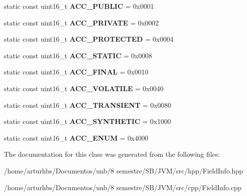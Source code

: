 \begin{DoxyCompactItemize}
\item 
static const uint16\+\_\+t {\bfseries A\+C\+C\+\_\+\+P\+U\+B\+L\+IC} = 0x0001\hypertarget{classFieldInfo_a75f5363e21c20fc65a93fc11a9aabcd3}{}\label{classFieldInfo_a75f5363e21c20fc65a93fc11a9aabcd3}

\item 
static const uint16\+\_\+t {\bfseries A\+C\+C\+\_\+\+P\+R\+I\+V\+A\+TE} = 0x0002\hypertarget{classFieldInfo_a693cbb85341c9b61b710f56f89d56442}{}\label{classFieldInfo_a693cbb85341c9b61b710f56f89d56442}

\item 
static const uint16\+\_\+t {\bfseries A\+C\+C\+\_\+\+P\+R\+O\+T\+E\+C\+T\+ED} = 0x0004\hypertarget{classFieldInfo_ac9df52613f502a46611a670d07715d74}{}\label{classFieldInfo_ac9df52613f502a46611a670d07715d74}

\item 
static const uint16\+\_\+t {\bfseries A\+C\+C\+\_\+\+S\+T\+A\+T\+IC} = 0x0008\hypertarget{classFieldInfo_a9358cd6a36145926bedbd8718c0118c5}{}\label{classFieldInfo_a9358cd6a36145926bedbd8718c0118c5}

\item 
static const uint16\+\_\+t {\bfseries A\+C\+C\+\_\+\+F\+I\+N\+AL} = 0x0010\hypertarget{classFieldInfo_a75c707ef25ffeac2c597fb4b263d7f0c}{}\label{classFieldInfo_a75c707ef25ffeac2c597fb4b263d7f0c}

\item 
static const uint16\+\_\+t {\bfseries A\+C\+C\+\_\+\+V\+O\+L\+A\+T\+I\+LE} = 0x0040\hypertarget{classFieldInfo_abfd881c22b6614454d43b694f7917a5b}{}\label{classFieldInfo_abfd881c22b6614454d43b694f7917a5b}

\item 
static const uint16\+\_\+t {\bfseries A\+C\+C\+\_\+\+T\+R\+A\+N\+S\+I\+E\+NT} = 0x0080\hypertarget{classFieldInfo_ab92e26f398d22b736caeb5b2cad1ad31}{}\label{classFieldInfo_ab92e26f398d22b736caeb5b2cad1ad31}

\item 
static const uint16\+\_\+t {\bfseries A\+C\+C\+\_\+\+S\+Y\+N\+T\+H\+E\+T\+IC} = 0x1000\hypertarget{classFieldInfo_ab29855bcd32f7626b25f8dbcbc0e9475}{}\label{classFieldInfo_ab29855bcd32f7626b25f8dbcbc0e9475}

\item 
static const uint16\+\_\+t {\bfseries A\+C\+C\+\_\+\+E\+N\+UM} = 0x4000\hypertarget{classFieldInfo_a91b395ce72803737a57c79ba5aa3640f}{}\label{classFieldInfo_a91b395ce72803737a57c79ba5aa3640f}

\end{DoxyCompactItemize}


The documentation for this class was generated from the following files\+:\begin{DoxyCompactItemize}
\item 
/home/arturhbs/\+Documentos/unb/8 semestre/\+S\+B/\+J\+V\+M/src/hpp/Field\+Info.\+hpp\item 
/home/arturhbs/\+Documentos/unb/8 semestre/\+S\+B/\+J\+V\+M/src/cpp/Field\+Info.\+cpp\end{DoxyCompactItemize}
